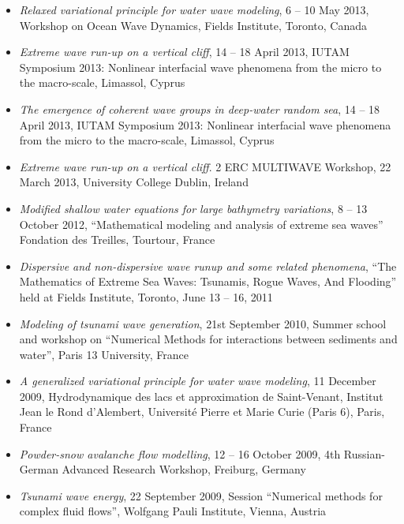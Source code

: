\documentclass[final, a4paper, oneside, 12pt]{article}
\numberwithin{equation}{section}
\begin{document}
\begin{itemize}
  \item \textit{Relaxed variational principle for water wave modeling}, 6 -- 10 May 2013, Workshop on Ocean Wave Dynamics, Fields Institute, Toronto, Canada

  \item \textit{Extreme wave run-up on a vertical cliff}, 14 -- 18 April 2013, IUTAM Symposium 2013: Nonlinear interfacial wave phenomena from the micro to the macro-scale, Limassol, Cyprus
  
  \item \textit{The emergence of coherent wave groups in deep-water random sea}, 14 -- 18 April 2013, IUTAM Symposium 2013: Nonlinear interfacial wave phenomena from the micro to the macro-scale, Limassol, Cyprus

  \item \textit{Extreme wave run-up on a vertical cliff}. 2 ERC MULTIWAVE Workshop, 22 March 2013, University College Dublin, Ireland

  \item \textit{Modified shallow water equations for large bathymetry variations}, 8 -- 13 October 2012, ``Mathematical modeling and analysis of extreme sea waves'' Fondation des Treilles, Tourtour, France

  \item \textit{Dispersive and non-dispersive wave runup and some related phenomena}, ``The Mathematics of Extreme Sea Waves: Tsunamis, Rogue Waves, And Flooding'' held at Fields Institute, Toronto, June 13 -- 16, 2011
  
  \item \textit{Modeling of tsunami wave generation}, 21st September 2010,  Summer school and workshop on ``Numerical Methods for interactions between sediments and water'', Paris 13 University, France
  
  \item \textit{A generalized variational principle for water wave modeling}, 11 December 2009, Hydrodynamique des lacs et approximation de Saint-Venant, Institut Jean le Rond d'Alembert, Universit\'e Pierre et Marie Curie (Paris 6), Paris, France
  
  \item \textit{Powder-snow avalanche flow modelling}, 12 -- 16 October 2009, 4th Russian-German Advanced Research Workshop, Freiburg, Germany
  
  \item \textit{Tsunami wave energy}, 22 September 2009, Session ``Numerical methods for complex fluid flows'', Wolfgang Pauli Institute, Vienna, Austria
  

\end{itemize}
\end{document}
